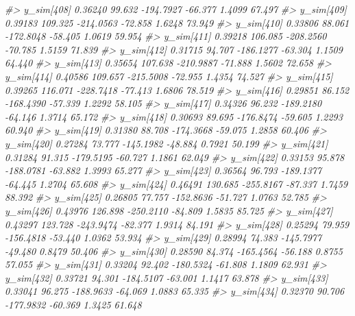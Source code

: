 \documentclass[
  10pt,
  italian,
  a4paper,
  extrafontsizes,onecolumn,openright
  ]{memoir}
\newenvironment{Shaded}{\begin{snugshade}}{\end{snugshade}}
\newcommand{\CommentTok}[1]{\textcolor[rgb]{0.56,0.35,0.01}{\textit{#1}}}
\begin{document}
\begin{Shaded}
\begin{Highlighting}[]
\CommentTok{\#\textgreater{}   y\_sim[408]  0.36240  99.632 {-}194.7927 {-}66.377  1.4099 67.497}
\CommentTok{\#\textgreater{}   y\_sim[409]  0.39183 109.325 {-}214.0563 {-}72.858  1.6248 73.949}
\CommentTok{\#\textgreater{}   y\_sim[410]  0.33806  88.061 {-}172.8048 {-}58.405  1.0619 59.954}
\CommentTok{\#\textgreater{}   y\_sim[411]  0.39218 106.085 {-}208.2560 {-}70.785  1.5159 71.839}
\CommentTok{\#\textgreater{}   y\_sim[412]  0.31715  94.707 {-}186.1277 {-}63.304  1.1509 64.440}
\CommentTok{\#\textgreater{}   y\_sim[413]  0.35654 107.638 {-}210.9887 {-}71.888  1.5602 72.658}
\CommentTok{\#\textgreater{}   y\_sim[414]  0.40586 109.657 {-}215.5008 {-}72.955  1.4354 74.527}
\CommentTok{\#\textgreater{}   y\_sim[415]  0.39265 116.071 {-}228.7418 {-}77.413  1.6806 78.519}
\CommentTok{\#\textgreater{}   y\_sim[416]  0.29851  86.152 {-}168.4390 {-}57.339  1.2292 58.105}
\CommentTok{\#\textgreater{}   y\_sim[417]  0.34326  96.232 {-}189.2180 {-}64.146  1.3714 65.172}
\CommentTok{\#\textgreater{}   y\_sim[418]  0.30693  89.695 {-}176.8474 {-}59.605  1.2293 60.940}
\CommentTok{\#\textgreater{}   y\_sim[419]  0.31380  88.708 {-}174.3668 {-}59.075  1.2858 60.406}
\CommentTok{\#\textgreater{}   y\_sim[420]  0.27284  73.777 {-}145.1982 {-}48.884  0.7921 50.199}
\CommentTok{\#\textgreater{}   y\_sim[421]  0.31284  91.315 {-}179.5195 {-}60.727  1.1861 62.049}
\CommentTok{\#\textgreater{}   y\_sim[422]  0.33153  95.878 {-}188.0781 {-}63.882  1.3993 65.277}
\CommentTok{\#\textgreater{}   y\_sim[423]  0.36564  96.793 {-}189.1377 {-}64.445  1.2704 65.608}
\CommentTok{\#\textgreater{}   y\_sim[424]  0.46491 130.685 {-}255.8167 {-}87.337  1.7459 88.392}
\CommentTok{\#\textgreater{}   y\_sim[425]  0.26805  77.757 {-}152.8636 {-}51.727  1.0763 52.785}
\CommentTok{\#\textgreater{}   y\_sim[426]  0.43976 126.898 {-}250.2110 {-}84.809  1.5835 85.725}
\CommentTok{\#\textgreater{}   y\_sim[427]  0.43297 123.728 {-}243.9474 {-}82.377  1.9314 84.191}
\CommentTok{\#\textgreater{}   y\_sim[428]  0.25294  79.959 {-}156.4818 {-}53.440  1.0362 53.934}
\CommentTok{\#\textgreater{}   y\_sim[429]  0.28994  74.383 {-}145.7977 {-}49.480  0.8479 50.406}
\CommentTok{\#\textgreater{}   y\_sim[430]  0.28590  84.374 {-}165.4564 {-}56.188  0.8755 57.055}
\CommentTok{\#\textgreater{}   y\_sim[431]  0.33204  92.402 {-}180.5324 {-}61.808  1.1809 62.931}
\CommentTok{\#\textgreater{}   y\_sim[432]  0.33721  94.301 {-}184.5107 {-}63.001  1.1417 63.878}
\CommentTok{\#\textgreater{}   y\_sim[433]  0.33041  96.275 {-}188.9633 {-}64.069  1.0883 65.335}
\CommentTok{\#\textgreater{}   y\_sim[434]  0.32370  90.706 {-}177.9832 {-}60.369  1.3425 61.648}

\end{Highlighting}
\end{Shaded}
\end{document}
